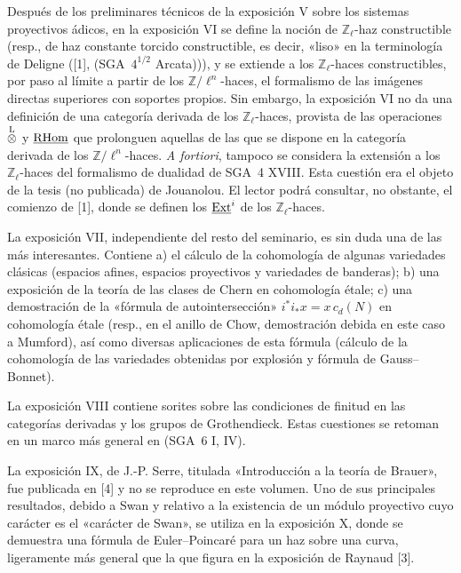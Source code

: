 Después de los preliminares técnicos de la exposición V sobre los sistemas proyectivos ádicos, en la exposición VI se define la noción de $\mathbb Z_\ell$-haz constructible (resp., de haz constante torcido constructible, es decir, «liso» en la terminología de Deligne ([1], (SGA~$4^{1/2}$ Arcata))), y se extiende a los $\mathbb Z_\ell$-haces constructibles, por paso al límite a partir de los $\mathbb Z/\ell^n$-haces, el formalismo de las imágenes directas superiores con soportes propios. Sin embargo, la exposición VI no da una definición de una categoría derivada de los $\mathbb Z_\ell$-haces, provista de las operaciones $\overset{\mathrm L}{\otimes}$ y $\underline{\mathrm{RHom}}$ que prolonguen aquellas de las que se dispone en la categoría derivada de los $\mathbb Z/\ell^n$-haces. \emph{A fortiori}, tampoco se considera la extensión a los $\mathbb Z_\ell$-haces del formalismo de dualidad de SGA~4 XVIII. Esta cuestión era el objeto de la tesis (no publicada) de Jouanolou. El lector podrá consultar, no obstante, el comienzo de [1], donde se definen los $\underline{\operatorname{Ext}}^i$ de los $\mathbb Z_\ell$-haces.

La exposición VII, independiente del resto del seminario, es sin duda una de las más interesantes. Contiene a) el cálculo de la cohomología de algunas variedades clásicas (espacios afines, espacios proyectivos y variedades de banderas); b) una exposición de la teoría de las clases de Chern en cohomología étale; c) una demostración de la «fórmula de autointersección» $i^*i_*x=x\,c_d(N)$ en cohomología étale (resp., en el anillo de Chow, demostración debida en este caso a Mumford), así como diversas aplicaciones de esta fórmula (cálculo de la cohomología de las variedades obtenidas por explosión y fórmula de Gauss--Bonnet).

La exposición VIII contiene sorites sobre las condiciones de finitud en las categorías derivadas y los grupos de Grothendieck. Estas cuestiones se retoman en un marco más general en (SGA~6 I, IV).

La exposición IX, de J.-P. Serre, titulada «Introducción a la teoría de Brauer», fue publicada en [4] y no se reproduce en este volumen. Uno de sus principales resultados, debido a Swan y relativo a la existencia de un módulo proyectivo cuyo carácter es el «carácter de Swan», se utiliza en la exposición X, donde se demuestra una fórmula de Euler--Poincaré para un haz sobre una curva, ligeramente más general que la que figura en la exposición de Raynaud [3].

